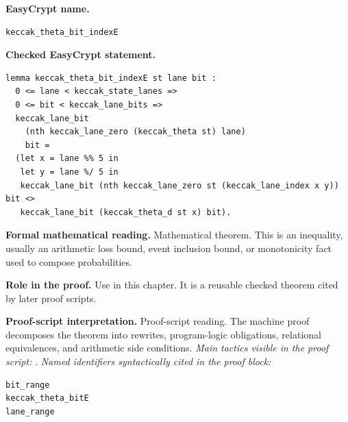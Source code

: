 \begin{formaltheorem}
\noindent\textbf{EasyCrypt name.}
\begin{lstlisting}[language=EasyCrypt,basicstyle=\ttfamily\scriptsize]
keccak_theta_bit_indexE
\end{lstlisting}
\noindent\textbf{Checked EasyCrypt statement.}
\begin{lstlisting}[language=EasyCrypt,basicstyle=\ttfamily\scriptsize]
lemma keccak_theta_bit_indexE st lane bit :
  0 <= lane < keccak_state_lanes =>
  0 <= bit < keccak_lane_bits =>
  keccak_lane_bit
    (nth keccak_lane_zero (keccak_theta st) lane)
    bit =
  (let x = lane %% 5 in
   let y = lane %/ 5 in
   keccak_lane_bit (nth keccak_lane_zero st (keccak_lane_index x y)) bit <>
   keccak_lane_bit (keccak_theta_d st x) bit).
\end{lstlisting}
\noindent\textbf{Formal mathematical reading.}
Mathematical theorem. This is an inequality, usually an arithmetic loss bound, event inclusion bound, or monotonicity fact used to compose probabilities.

\noindent\textbf{Role in the proof.}
Use in this chapter. It is a reusable checked theorem cited by later proof scripts.

\noindent\textbf{Proof-script interpretation.}
Proof-script reading. The machine proof decomposes the theorem into rewrites, program-logic obligations, relational equivalences, and arithmetic side conditions.
\emph{Main tactics visible in the proof script:} .
\emph{Named identifiers syntactically cited in the proof block:}
\begin{lstlisting}[language=EasyCrypt,basicstyle=\ttfamily\scriptsize]
bit_range
keccak_theta_bitE
lane_range
\end{lstlisting}

\end{formaltheorem}

